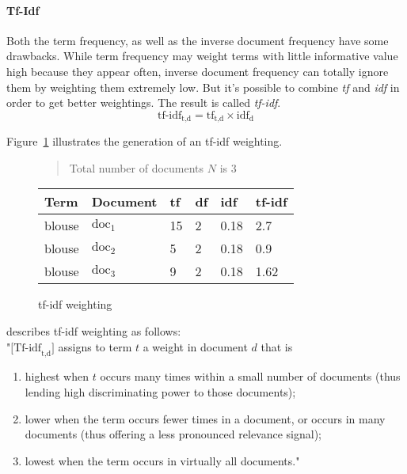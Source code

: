 \paragraph{Tf-Idf}
\label{sec:tfidf}
Both the term frequency, as well as the inverse document frequency have some drawbacks.
While term frequency may weight terms with little informative value high because they appear often, inverse document frequency can totally ignore them by weighting them extremely low.
But it's possible to combine \textit{tf} and \textit{idf} in order to get better weightings.
The result is called \textit{tf-idf}.\citep[p.~118-119]{manning:2009}
\begin{equation}
    \text{tf-idf}_{\text{t,d}} = \text{tf}_\text{t,d} \times \text{idf}_\text{d}
    \label{eq:tf-idf-forumula}
\end{equation}

\noindent
Figure~\ref{fig:tfidfweighting} illustrates the generation of an tf-idf weighting.
\begin{figure}[h]

    \begin{quote}
        Total number of documents $N$ is 3\\
    \end{quote}

    \center
    \begin{tabular}{ l l | l l l l }
        \rowcolor{\dustRowHead}
        Term                    & Document          & tf    & df & idf   & tf-idf\\\hline
        blouse                  & $\text{doc}_1$    & 15    &  2 & 0.18  & 2.7\\
        blouse                  & $\text{doc}_2$    & 5     &  2 & 0.18  & 0.9\\
        blouse                  & $\text{doc}_3$    & 9     &  2 & 0.18  & 1.62\\
    \end{tabular}
    \caption{tf-idf weighting}
    \label{fig:tfidfweighting}
\end{figure}

\noindent
\citeauthor{manning:2009} describes tf-idf weighting as follows:\\
"$\text{[Tf-idf}_{\text{t,d}}\text{]}$ assigns to term $t$ a weight in document $d$ that is
\begin{enumerate}
    \item highest when $t$ occurs many times within a small number of documents
    (thus lending high discriminating power to those documents);
    \item lower when the term occurs fewer times in a document, or occurs in many
    documents (thus offering a less pronounced relevance signal);
    \item lowest when the term occurs in virtually all documents."
\end{enumerate}
\citep[p.~119]{manning:2009}

